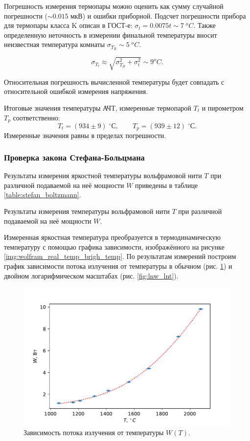 \documentclass[10pt,a4paper]{article}
\newcommand{\cels}{\; ^\circ С}
\begin{document}
\begin{multicols}{2}
	Погрешность измерения термопары можно оценить как сумму случайной погрешности ($\sim0.015\;\text{мкВ}$) и ошибки приборной. Подсчет погрешности прибора для термопары класса K описан в ГОСТ-е: $\sigma_t = 0.0075t \sim 7\; ^oC$. Также определенную неточность в измерении финальной температуры вносит неизвестная температура комнаты $\sigma_{T_R} \sim 5\; ^oC$.
	
	$$\sigma_{T_t} \approx \sqrt{\sigma_{T_R}^2 + \sigma_t^2} \sim 9 ^oC.$$
	
	Относительная погрешность вычисленной температуры будет совпадать с относительной ошибкой измерения напряжения. 
	
	Итоговые значения температуры АЧТ, измеренные термопарой $T_t$ и пирометром $T_p$ соответственно:
	$$
	T_t = (934 \pm 9) \cels,\qquad T_p = (939 \pm 12) \cels.
	$$	
	Измеренные значения равны в пределах погрешности.
	
	\subsubsection*{Проверка закона Стефана-Больцмана}
	
	Результаты измерения яркостной температуры вольфрамовой нити $T$ при различной подаваемой на неё мощности $W$ приведены в таблице \ref{table:stefan_boltzmann}.
	
	\begin{table}[H]
		\addtolength{\tabcolsep}{-4pt}
		\footnotesize
		
		\caption{Результаты измерения температуры вольфрамовой нити $T$ при различной подаваемой на неё мощности $W$.}
		\label{table:stefan_boltzmann}
	\end{table}
	
	Измеренная яркостная температура преобразуется в термодинамическую температуру с помощью графика зависимости, изображённого на рисунке \ref{img:wolfram_real_temp_brigh_temp}. По результатам измерений построим график зависимости потока излучения от температуры в обычном (рис. \ref{fig:wt}) и двойном логарифмическом масштабах (рис. \ref{fig:lnw_lnt}).
	
	\begin{figure}[H]
		\includegraphics[width=1\textwidth]{gen/fig-wt.pdf}
		\caption{Зависимость потока излучения от температуры $W(T)$.}
		\label{fig:wt}
	\end{figure}


\end{multicols}
\end{document}
